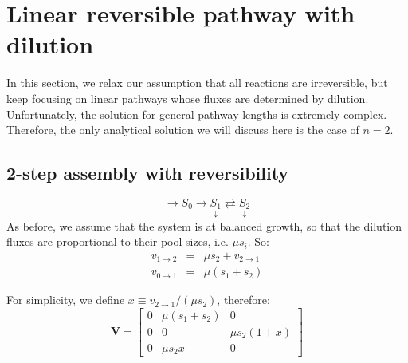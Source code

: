 \documentclass{article}
\newcommand{\fin}{\ensuremath{\langle f \rangle}}
\newcommand{\flux}[2]{\ensuremath{v_{{#1} \rightarrow {#2}}}}
\begin{document}
\begin{center}
\end{center}

\section{Linear reversible pathway with dilution}
In this section, we relax our assumption that all reactions are irreversible, but keep focusing on linear pathways whose fluxes are determined by dilution. Unfortunately, the solution for general pathway lengths is extremely complex. Therefore, the only analytical solution we will discuss here is the case of $n = 2$.

\subsection{2-step assembly with reversibility}

\begin{equation}
    \rightarrow S_0 
    \rightarrow \underset{\downarrow}{S_1}
    \rightleftarrows \underset{\downarrow}{S_2}
\end{equation}
As before, we assume that the system is at balanced growth, so that the dilution fluxes are proportional to their pool sizes, i.e. $\mu s_i$. So:
\begin{eqnarray}
    \flux{1}{2} &=& \mu s_2 + \flux{2}{1}\\
    \flux{0}{1} &=& \mu (s_1 + s_2)
\end{eqnarray}

For simplicity, we define $x \equiv \flux{2}{1} / (\mu s_2)$, therefore:
\[\mathbf{V} =
    \begin{bmatrix}
        0 & \mu (s_1 + s_2) & 0\\
        0 & 0 & \mu s_2 (1 + x) \\
        0 & \mu s_2 x & 0
    \end{bmatrix}
\]
\end{document}
